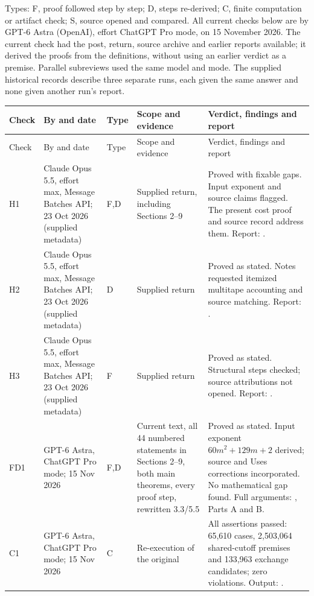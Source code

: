Types: F, proof followed step by step; D, steps re-derived; C, finite computation or artifact check; S, source opened and compared. All current checks below are by GPT-6 Astra (OpenAI), effort ChatGPT Pro mode, on 15 November 2026. The current check had the post, return, source archive and earlier reports available; it derived the proofs from the definitions, without using an earlier verdict as a premise. Parallel subreviews used the same model and mode. The supplied historical records describe three separate runs, each given the same answer and none given another run's report.

{\footnotesize
\begin{longtable}{@{}L{1.0cm}L{2.8cm}L{0.7cm}L{3.8cm}L{6.0cm}@{}}
\toprule
Check & By and date & Type & Scope and evidence & Verdict, findings and report\\
\midrule
\endfirsthead
\toprule
Check & By and date & Type & Scope and evidence & Verdict, findings and report\\
\midrule
\endhead
\bottomrule
\endfoot
H1 & Claude Opus 5.5, effort max, Message Batches API; 23 Oct 2026 (supplied metadata) & F,D & Supplied return, including Sections 2--9 & Proved with fixable gaps. Input exponent and source claims flagged. The present cost proof and source record address them. Report: .\\[3pt]
H2 & Claude Opus 5.5, effort max, Message Batches API; 23 Oct 2026 (supplied metadata) & D & Supplied return & Proved as stated. Notes requested itemized multitape accounting and source matching. Report: .\\[3pt]
H3 & Claude Opus 5.5, effort max, Message Batches API; 23 Oct 2026 (supplied metadata) & F & Supplied return & Proved as stated. Structural steps checked; source attributions not opened. Report: .\\[3pt]
FD1 & GPT-6 Astra, ChatGPT Pro mode; 15 Nov 2026 & F,D & Current text, all 44 numbered statements in Sections 2--9, both main theorems, every proof step, rewritten 3.3/5.5 & Proved as stated. Input exponent $60m^2+129m+2$ derived; source and Uses corrections incorporated. No mathematical gap found. Full arguments: , Parts A and B.\\[3pt]
C1 & GPT-6 Astra, ChatGPT Pro mode; 15 Nov 2026 & C & Re-execution of the original  & All assertions passed: 65,610 cases, 2,503,064 shared-cutoff premises and 133,963 exchange candidates; zero violations. Output: .\\[3pt]

\end{longtable}}
